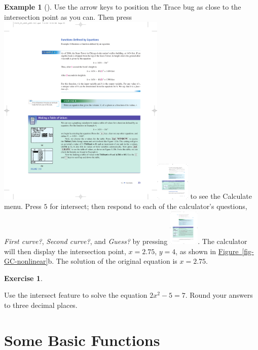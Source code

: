 \documentclass[10pt,]{book}
\theoremstyle{plain}
\theoremstyle{definition}
\theoremstyle{definition}
\theoremstyle{definition}
\newtheorem{example}[theorem]{Example}
\theoremstyle{definition}
\theoremstyle{definition}
\newtheorem{exercise}[theorem]{Exercise}
\numberwithin{equation}{section}
\begin{document}
\begin{example}[]
    Use the arrow keys to position the Trace bug as close to the intersection point as you can. Then press \includegraphics[width=0.6\textwidth,]{images/icon-2nd.pdf}\includegraphics[width=0.12\textwidth,]{images/icon-trace.pdf} to see the Calculate menu. Press \(5\) for intersect; then respond to each of the calculator's questions, \emph{First curve?}, \emph{Second curve?}, and \emph{Guess?} by pressing \includegraphics[width=0.11\textwidth,]{images/icon-enter.pdf}. The calculator will then display the intersection point, \(x = 2.75\), \(y = 4\), as shown in \hyperref[fig-GC-nonlinear]{Figure~\ref{fig-GC-nonlinear}}b. The solution of the original equation is \(x = 2.75\).
\end{example}
\begin{exercise}\label{exercise-GC-nonlinear}

    Use the intersect feature to solve the equation \(2x^2 − 5 = 7\). Round your answers to three decimal places.
\end{exercise}
\typeout{************************************************}
\typeout{************************************************}
\section[Some Basic Functions]{Some Basic Functions}\label{basic-functions}
\end{document}

